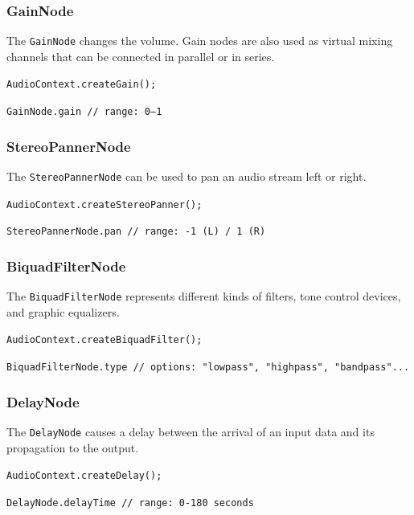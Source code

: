 \documentclass[screen, aspectratio=43]{beamer}
\begin{document}
%
\begin{frame}
\frametitle{GainNode}
The \texttt{GainNode} changes the volume. Gain nodes are also used as virtual mixing channels that can be connected in parallel or in series.\\
\vspace{10 mm}
\centerline{\texttt{AudioContext.createGain();}}
\vspace{2 mm}
\centerline{\texttt{GainNode.gain // range: 0--1}}
\vspace{10 mm}
\end{frame}
%
\begin{frame}
\frametitle{StereoPannerNode}
The \texttt{StereoPannerNode} can be used to pan an audio stream left or right.\\
\vspace{10 mm}
\centerline{\texttt{AudioContext.createStereoPanner();}}
\vspace{2 mm}
\centerline{\texttt{StereoPannerNode.pan // range: -1 (L) / 1 (R)}}
\vspace{10 mm}
\end{frame}
%
\begin{frame}
\frametitle{BiquadFilterNode}
The \texttt{BiquadFilterNode} represents different kinds of filters, tone control devices, and graphic equalizers.\\
\vspace{10 mm}
\centerline{\texttt{AudioContext.createBiquadFilter();}}
\vspace{2 mm}
\centerline{\texttt{BiquadFilterNode.type // options: "lowpass", "highpass", "bandpass"...}}
\vspace{10 mm}
\end{frame}
%
\begin{frame}
\frametitle{DelayNode}
The \texttt{DelayNode} causes a delay between the arrival of an input data and its propagation to the output.\\
\vspace{10 mm}
\centerline{\texttt{AudioContext.createDelay();}}
\vspace{2 mm}
\centerline{\texttt{DelayNode.delayTime // range: 0-180 seconds}}
\vspace{10 mm}
\end{frame}
\end{document}

